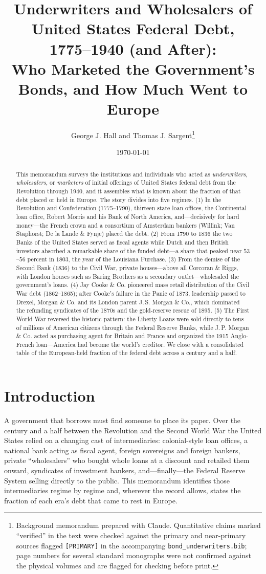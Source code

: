 \documentclass[12pt]{article}
\title{Underwriters and Wholesalers of United States Federal Debt,\\
1775--1940 (and After):\\
Who Marketed the Government's Bonds, and How Much Went to Europe}
\author{George J. Hall and Thomas J. Sargent\thanks{Background memorandum
prepared with Claude. Quantitative claims marked ``verified'' in the text
were checked against the primary and near-primary sources flagged
\texttt{[PRIMARY]} in the accompanying \texttt{bond\_underwriters.bib};
page numbers for several standard monographs were not confirmed against the
physical volumes and are flagged for checking before print.}}
\date{\today}
\begin{document}
\maketitle

\begin{abstract}
This memorandum surveys the institutions and individuals who acted as
\emph{underwriters}, \emph{wholesalers}, or \emph{marketers} of initial
offerings of United States federal debt from the Revolution through 1940,
and it assembles what is known about the fraction of that debt placed or held
in Europe. The story divides into five regimes. (1) In the Revolution and
Confederation (1775--1790), thirteen state loan offices, the Continental loan
office, Robert Morris and his Bank of North America, and---decisively for
hard money---the French crown and a consortium of Amsterdam bankers
(Willink; Van Staphorst; De la Lande \& Fynje) placed the debt. (2) From 1790
to 1836 the two Banks of the United States served as fiscal agents while Dutch
and then British investors absorbed a remarkable share of the funded debt---a
share that peaked near $53$--$56$ percent in $1803$, the year of the
Louisiana Purchase. (3) From the demise of the Second Bank (1836) to the Civil
War, private houses---above all Corcoran \& Riggs, with London houses such as
Baring Brothers as a secondary outlet---wholesaled the government's loans. (4) Jay Cooke \& Co.
pioneered mass retail distribution of the Civil War debt (1862--1865); after
Cooke's failure in the Panic of 1873, leadership passed to Drexel, Morgan \&
Co. and its London parent J.\,S. Morgan \& Co., which dominated the refunding
syndicates of the 1870s and the gold-reserve rescue of 1895. (5) The First
World War reversed the historic pattern: the Liberty Loans were sold directly
to tens of millions of American citizens through the Federal Reserve Banks,
while J.\,P. Morgan \& Co. acted as purchasing agent for Britain and France
and organized the 1915 Anglo-French loan---America had become the world's
creditor. We close with a consolidated table of the European-held fraction of
the federal debt across a century and a half.
\end{abstract}

\section{Introduction}

A government that borrows must find someone to place its paper. Over the
century and a half between the Revolution and the Second World War the United
States relied on a changing cast of intermediaries: colonial-style loan
offices, a national bank acting as fiscal agent, foreign sovereigns and
foreign bankers, private ``wholesalers'' who bought whole loans at a discount
and retailed them onward, syndicates of investment bankers, and---finally---the
Federal Reserve System selling directly to the public. This memorandum
identifies those intermediaries regime by regime and, wherever the record
allows, states the fraction of each era's debt that came to rest in Europe.
\end{document}
